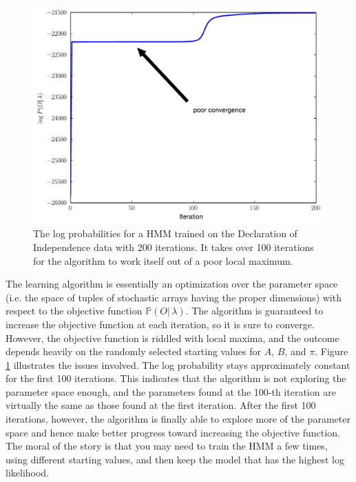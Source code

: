 \begin{figure}
\centering
\includegraphics[width=\textwidth]{logProbs.pdf}
\caption{The log probabilities for a HMM trained on the Declaration of Independence
data with 200 iterations. It takes over 100 iterations for the algorithm to work itself out
of a poor local maximum.}
\label{fig:logprobs}
\end{figure}


The learning algorithm is essentially an optimization over the parameter space (i.e. the space of tuples of
stochastic arrays having the proper dimensions) with respect to the objective function $\mathbb{P}(O |\, \lambda)$.
The algorithm is guaranteed to increase the objective function at each iteration, so it is sure to converge.
However, the objective function is riddled with local maxima, and the outcome depends heavily on the randomly
selected starting values for $A$, $B$, and $\pi$. Figure \ref{fig:logprobs} illustrates the issues involved.
The log probability stays approximately constant for the first 100
iterations. This indicates that the algorithm is not exploring the parameter space enough, and the parameters
found at the 100-th iteration are virtually the same as those found at the first iteration. After the first
100 iterations, however, the algorithm is finally able to explore more of the parameter space and hence make
better progress toward increasing the objective function. The moral of the story is that you may need to train
the HMM a few times, using different starting values, and then keep the model that has the highest log likelihood.


